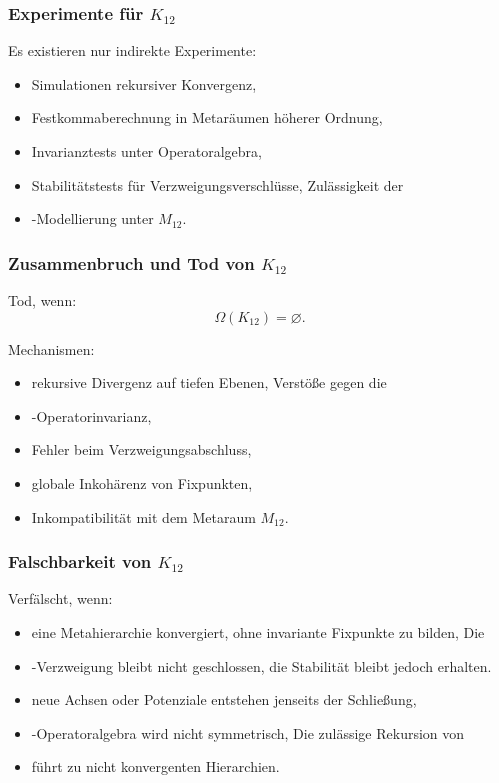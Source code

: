 \subsubsection{Experimente für $K_{12}$}

Es existieren nur indirekte Experimente:
\begin{itemize}
    \item Simulationen rekursiver Konvergenz,
    \item Festkommaberechnung in Metaräumen höherer Ordnung,
    \item Invarianztests unter Operatoralgebra,
    \item Stabilitätstests für Verzweigungsverschlüsse,
    Zulässigkeit der \item-Modellierung unter $M_{12}$.
\end{itemize}

\subsubsection{Zusammenbruch und Tod von $K_{12}$}

Tod, wenn:
\[
\Omega(K_{12})=\varnothing.
\]

Mechanismen:
\begin{itemize}
    \item rekursive Divergenz auf tiefen Ebenen,
    Verstöße gegen die \item-Operatorinvarianz,
    \item Fehler beim Verzweigungsabschluss,
    \item globale Inkohärenz von Fixpunkten,
    \item Inkompatibilität mit dem Metaraum $M_{12}$.
\end{itemize}

\subsubsection{Falschbarkeit von $K_{12}$}

Verfälscht, wenn:
\begin{itemize}
    \item eine Metahierarchie konvergiert, ohne invariante Fixpunkte zu bilden,
    Die \item-Verzweigung bleibt nicht geschlossen, die Stabilität bleibt jedoch erhalten.
    \item neue Achsen oder Potenziale entstehen jenseits der Schließung,
    \item-Operatoralgebra wird nicht symmetrisch,
    Die zulässige Rekursion von \item führt zu nicht konvergenten Hierarchien.
\end{itemize}

